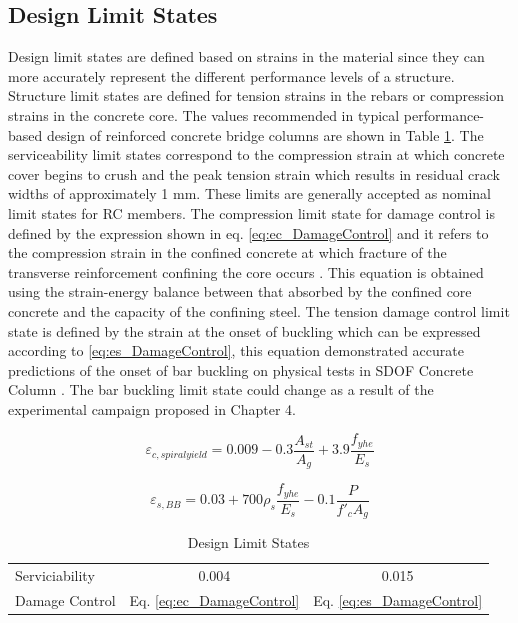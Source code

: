 \subsection{Design Limit States}
Design limit states are defined based on strains in the material since they can more accurately represent the different performance levels of a structure. Structure limit states are defined for tension strains in the rebars or compression strains in the concrete core. The values recommended in typical performance-based design of reinforced concrete bridge columns are shown in Table  \ref{tab:DesignLimitStates}. The serviceability limit states correspond to the compression strain at which concrete cover begins to crush and the peak tension strain which results in residual crack widths of approximately 1 mm. These limits are generally accepted as nominal limit states for RC members. The compression limit state for damage control is defined by the expression shown in eq. \ref{eq:ec_DamageControl} and it refers to the compression strain in the confined concrete at which fracture of the transverse reinforcement confining the core occurs \cite{Priestley2007}. This equation is obtained using the strain-energy balance between that absorbed by the confined core concrete and the capacity of the confining steel. The tension damage control limit state is defined by the strain at the onset of buckling which can be expressed according to \ref{eq:es_DamageControl}, this equation demonstrated accurate predictions of the onset of bar buckling on physical tests in SDOF Concrete Column \cite{Goodnight2016}. The bar buckling limit state could change as a result of the experimental campaign proposed in Chapter 4.

\begin{equation}
    \varepsilon_{c,spiral yield}=0.009-0.3\frac{A_{st}}{A_{g}} +3.9\frac{f_{yhe}}{E_{s}}
    \label{eq:ec_DamageControl}
\end{equation}

\begin{equation}
    \varepsilon_{s,BB}=0.03+700\rho_{s}  \frac{f_{yhe}}{E_{s}} -0.1\frac{P}{f'_{c}A_{g}}
    \label{eq:es_DamageControl}
\end{equation}


\begin{table}[htbp]
	\caption{Design Limit States}
	\label{tab:DesignLimitStates}
	\centering	
		\begin{tabular}{|l|c|c|}
		\hline
		\cellcolor[HTML]{CC0000}{\color[HTML]{FFFFFF}Limit State} & \cellcolor[HTML]{CC0000}{\color[HTML]{FFFFFF}Concrete Limit State $\varepsilon_{c} (in/in)$} & \cellcolor[HTML]{CC0000}{\color[HTML]{FFFFFF}Reinforcing Steel Limit State $\varepsilon_{s} (in/in)$}\\  \hline	
		Serviciability       & 0.004                           & 0.015  \\  \hline	
		Damage Control       & Eq. \ref{eq:ec_DamageControl}   & Eq. \ref{eq:es_DamageControl}\\  \hline
		\end{tabular}
\end{table}
 
